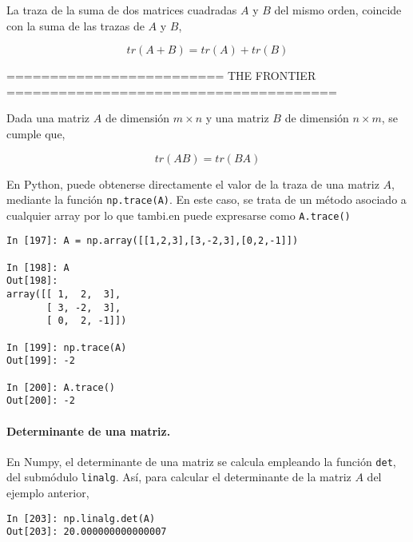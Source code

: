 \begin{paracol}{2}
La traza de la suma de dos matrices cuadradas $A$ y $B$ del mismo orden, coincide con la suma de las trazas de $A$ y $B$,    
\end{paracol}

\begin{equation*}
tr(A+B)=tr(A)+tr(B)
\end{equation*}

========================= THE FRONTIER ======================================
\begin{paracol}{2}
Dada una  matriz $A$ de dimensión $m\times n$  y una matriz $B$ de dimensión $n \times m$, se  cumple que,    
\end{paracol}

\begin{equation*}
tr(AB)=tr(BA)
\end{equation*}
\begin{paracol}{2}
En Python, puede obtenerse directamente el valor de la traza de una matriz $A$, mediante la función \texttt{np.trace(A)}. En este caso, se trata de un método asociado a cualquier array por lo que tambi.en puede expresarse como \texttt{A.trace()}  
\end{paracol}

\begin{center}
\begin{minipage}{0.5\textwidth}
\begin{verbatim}
In [197]: A = np.array([[1,2,3],[3,-2,3],[0,2,-1]])

In [198]: A
Out[198]: 
array([[ 1,  2,  3],
       [ 3, -2,  3],
       [ 0,  2, -1]])

In [199]: np.trace(A)
Out[199]: -2

In [200]: A.trace()
Out[200]: -2
\end{verbatim}
\end{minipage}
\end{center}


\begin{paracol}{2}
\paragraph{Determinante de una matriz.} 
En Numpy, el determinante de una matriz se calcula  empleando la función \texttt{det}, del submódulo \texttt{linalg}. Así, para calcular el determinante de la matriz $A$ del ejemplo anterior,
\end{paracol}
\begin{center}
\begin{minipage}{0.5\textwidth}
\begin{verbatim}
In [203]: np.linalg.det(A)
Out[203]: 20.000000000000007
\end{verbatim}
\end{minipage}
\end{center}


